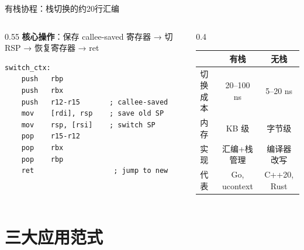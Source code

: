 \documentclass[aspectratio=169, 10pt]{beamer}
\begin{document}
\begin{frame}[fragile]{有栈协程：栈切换的约20行汇编}
  \begin{columns}[T]
    \begin{column}{0.55\textwidth}
      \textbf{核心操作}：保存 callee-saved 寄存器 → 切 RSP → 恢复寄存器 → ret
      \begin{lstlisting}[title={x86\_64 协程切换 (简化)}]
switch_ctx:
    push   rbp
    push   rbx
    push   r12-r15       ; callee-saved
    mov    [rdi], rsp    ; save old SP
    mov    rsp, [rsi]    ; switch SP
    pop    r15-r12
    pop    rbx
    pop    rbp
    ret                   ; jump to new
      \end{lstlisting}
    \end{column}
    \begin{column}{0.4\textwidth}
      \small
      \begin{tabular}{lcc}
        \toprule
        & \textbf{有栈} & \textbf{无栈} \\
        \midrule
        切换成本 & 20--100 ns & 5--20 ns \\
        内存 & KB 级 & 字节级 \\
        实现 & 汇编+栈管理 & 编译器改写 \\
        代表 & Go, ucontext & C++20, Rust \\
        \bottomrule
      \end{tabular}
    \end{column}
  \end{columns}
\end{frame}

\section{三大应用范式}
\end{document}
